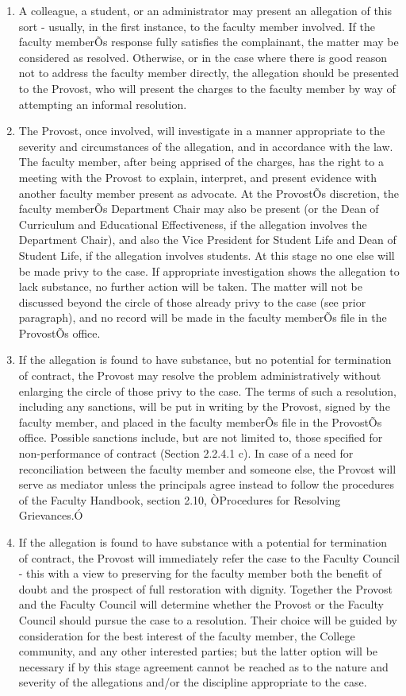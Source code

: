 \documentclass[letterpaper, 11pt]{article}
\begin{document}
				\begin{enumerate}[label=\alph*)]
					\item{A colleague, a student, or an administrator may present an allegation of this sort - usually, in the first instance, to the faculty member involved.  If the faculty memberÕs response fully satisfies the complainant, the matter may be considered as resolved.  Otherwise, or in the case where there is good reason not to address the faculty member directly, the allegation should be presented to the Provost, who will present the charges to the faculty member by way of attempting an informal resolution.}
					\item{The Provost, once involved, will investigate in a manner appropriate to the severity and circumstances of the allegation, and in accordance with the law.  The faculty member, after being apprised of the charges, has the right to a meeting with the Provost to explain, interpret, and present evidence with another faculty member present as advocate.  At the ProvostÕs discretion, the faculty memberÕs Department Chair may also be present (or the Dean of Curriculum and Educational Effectiveness, if the allegation involves the Department Chair), and also the Vice President for Student Life and Dean of Student Life, if the allegation involves students.  At this stage no one else will be made privy to the case.}
					If appropriate investigation shows the allegation to lack substance, no further action will be taken.  The matter will not be discussed beyond the circle of those already privy to the case (see prior paragraph), and no record will be made in the faculty memberÕs file in the ProvostÕs office.
					\item{If the allegation is found to have substance, but no potential for termination of contract, the Provost may resolve the problem administratively without enlarging the circle of those privy to the case.  The terms of such a resolution, including any sanctions, will be put in writing by the Provost, signed by the faculty member, and placed in the faculty memberÕs file in the ProvostÕs office.  Possible sanctions include, but are not limited to, those specified for non-performance of contract (Section 2.2.4.1 c).  In case of a need for reconciliation between the faculty member and someone else, the Provost will serve as mediator unless the principals agree instead to follow the procedures of the Faculty Handbook, section 2.10, ÒProcedures for Resolving Grievances.Ó}
					\item{If the allegation is found to have substance with a potential for termination of contract, the Provost will immediately refer the case to the Faculty Council - this with a view to preserving for the faculty member both the benefit of doubt and the prospect of full restoration with dignity.  Together the Provost and the Faculty Council will determine whether the Provost or the Faculty Council should pursue the case to a resolution.  Their choice will be guided by consideration for the best interest of the faculty member, the College community, and any other interested parties; but the latter option will be necessary if by this stage agreement cannot be reached as to the nature and severity of the allegations and/or the discipline appropriate to the case.
}
\end{enumerate}
\end{document}
